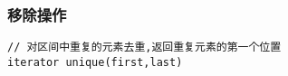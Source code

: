 \subsubsection{移除操作}
\begin{lstlisting}
// 对区间中重复的元素去重,返回重复元素的第一个位置
iterator unique(first,last)
\end{lstlisting}